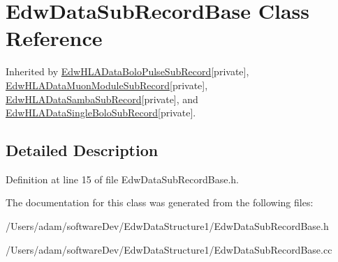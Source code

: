 \hypertarget{class_edw_data_sub_record_base}{
\section{EdwDataSubRecordBase Class Reference}
\label{class_edw_data_sub_record_base}
}


Inherited by \hyperlink{class_edw_h_l_a_data_bolo_pulse_sub_record}{EdwHLADataBoloPulseSubRecord}{\ttfamily  \mbox{[}private\mbox{]}}, \hyperlink{class_edw_h_l_a_data_muon_module_sub_record}{EdwHLADataMuonModuleSubRecord}{\ttfamily  \mbox{[}private\mbox{]}}, \hyperlink{class_edw_h_l_a_data_samba_sub_record}{EdwHLADataSambaSubRecord}{\ttfamily  \mbox{[}private\mbox{]}}, and \hyperlink{class_edw_h_l_a_data_single_bolo_sub_record}{EdwHLADataSingleBoloSubRecord}{\ttfamily  \mbox{[}private\mbox{]}}.



\subsection{Detailed Description}


Definition at line 15 of file EdwDataSubRecordBase.h.



The documentation for this class was generated from the following files:\begin{DoxyCompactItemize}
\item 
/Users/adam/softwareDev/EdwDataStructure1/EdwDataSubRecordBase.h\item 
/Users/adam/softwareDev/EdwDataStructure1/EdwDataSubRecordBase.cc\end{DoxyCompactItemize}
